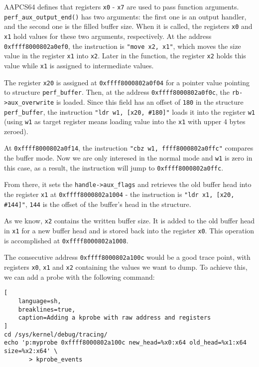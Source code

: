 \documentclass[11pt]{diazessay} %
\def\code#1{\texttt{#1}}
\begin{document}
AAPCS64 defines that registers \code{x0} - \code{x7} are used to pass
function arguments. \code{perf\_aux\_output\_end()} has two arguments: the
first one is an output handler, and the second one is the filled buffer
size. When it is called, the registers \code{x0} and \code{x1} hold values for
these two arguments, respectively. At the address \code{0xffff8000802a0ef0},
the instruction is \code{"move x2, x1"}, which moves the size value in the
register \code{x1} into \code{x2}. Later in the function, the register
\code{x2} holds this value while \code{x1} is assigned to intermediate values.

The register \code{x20} is assigned at \code{0xffff8000802a0f04} for a pointer
value pointing to structure \code{perf\_buffer}. Then, at the address
\code{0xffff8000802a0f0c}, the \code{rb->aux\_overwrite} is loaded. Since this
field has an offset of \code{180} in the structure \code{perf\_buffer}, the
instruction \code{"ldr w1, [x20, \#180]"} loads it into the register \code{w1}
(using \code{w1} as target register means loading value into the \code{x1}
with upper 4 bytes zeroed).

At \code{0xffff8000802a0f14}, the instruction \code{"cbz w1, ffff8000802a0ffc"}
compares the buffer mode. Now we are only interesed in the normal mode and
\code{w1} is zero in this case, as a result, the instruction  will jump to
\code{0xffff8000802a0ffc}.

From there, it sets the \code{handle->aux\_flags} and retrieves the old buffer
head into the register \code{x1} at \code{0xffff8000802a1004} - the
instruction is \code{"ldr x1, [x20, \#144]"}, \code{144} is the offset of the
buffer's head in the structure.

As we know, \code{x2} contains the written buffer size. It is added to the
old buffer head in \code{x1} for a new buffer head and is stored back
into the register \code{x0}. This operation is accomplished at
\code{0xffff8000802a1008}.

The consecutive address \code{0xffff8000802a100c} would be a good trace point,
with registers \code{x0}, \code{x1} and \code{x2} containing the values we
want to dump. To achieve this, we can add a probe with the following command:

\begin{lstlisting}[
  	language=sh,
	breaklines=true,
	caption=Adding a kprobe with raw address and registers
]
cd /sys/kernel/debug/tracing/
echo 'p:myprobe 0xffff8000802a100c new_head=%x0:x64 old_head=%x1:x64 size=%x2:x64' \
       > kprobe_events
\end{lstlisting}
\end{document}
